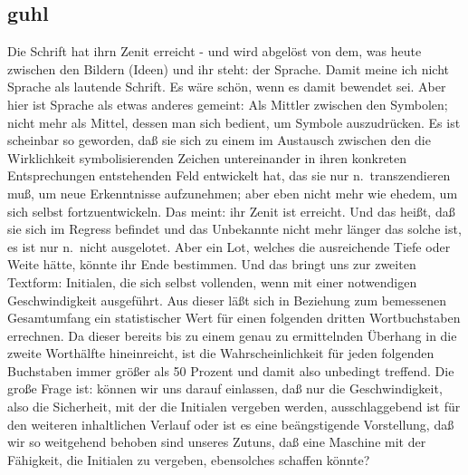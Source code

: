 \documentclass[
]{article}
\author{}
\date{\vspace{-2.5em}}
\begin{document}
\subsection{guhl}\label{guhl}

Die Schrift hat ihrn Zenit erreicht - und wird abgelöst von dem, was
heute zwischen den Bildern (Ideen) und ihr steht: der Sprache. Damit
meine ich nicht Sprache als lautende Schrift. Es wäre schön, wenn es
damit bewendet sei. Aber hier ist Sprache als etwas anderes gemeint: Als
Mittler zwischen den Symbolen; nicht mehr als Mittel, dessen man sich
bedient, um Symbole auszudrücken. Es ist scheinbar so geworden, daß sie
sich zu einem im Austausch zwischen den die Wirklichkeit
symbolisierenden Zeichen untereinander in ihren konkreten Entsprechungen
entstehenden Feld entwickelt hat, das sie nur n.~transzendieren muß, um
neue Erkenntnisse aufzunehmen; aber eben nicht mehr wie ehedem, um sich
selbst fortzuentwickeln. Das meint: ihr Zenit ist erreicht. Und das
heißt, daß sie sich im Regress befindet und das Unbekannte nicht mehr
länger das solche ist, es ist nur n.~nicht ausgelotet. Aber ein Lot,
welches die ausreichende Tiefe oder Weite hätte, könnte ihr Ende
bestimmen. Und das bringt uns zur zweiten Textform: Initialen, die sich
selbst vollenden, wenn mit einer notwendigen Geschwindigkeit ausgeführt.
Aus dieser läßt sich in Beziehung zum bemessenen Gesamtumfang ein
statistischer Wert für einen folgenden dritten Wortbuchstaben errechnen.
Da dieser bereits bis zu einem genau zu ermittelnden Überhang in die
zweite Worthälfte hineinreicht, ist die Wahrscheinlichkeit für jeden
folgenden Buchstaben immer größer als 50 Prozent und damit also
unbedingt treffend. Die große Frage ist: können wir uns darauf
einlassen, daß nur die Geschwindigkeit, also die Sicherheit, mit der die
Initialen vergeben werden, ausschlaggebend ist für den weiteren
inhaltlichen Verlauf oder ist es eine beängstigende Vorstellung, daß wir
so weitgehend behoben sind unseres Zutuns, daß eine Maschine mit der
Fähigkeit, die Initialen zu vergeben, ebensolches schaffen könnte?
\end{document}
